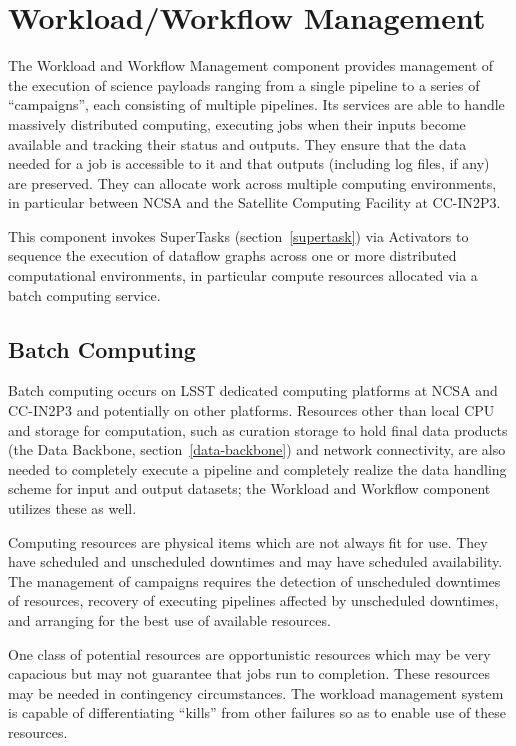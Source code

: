 \documentclass[DM,lsstdraft,toc]{lsstdoc}
\begin{document}
\section{Workload/Workflow Management}\label{workload-workflow-management}

The Workload and Workflow Management component provides management of the
execution of science payloads ranging from a single pipeline to a series of
``campaigns'', each consisting of multiple pipelines. Its services are able to
handle massively distributed computing, executing jobs when their inputs become
available and tracking their status and outputs. They ensure that the data
needed for a job is accessible to it and that outputs (including log files, if
any) are preserved. They can allocate work across multiple computing
environments, in particular between NCSA and the Satellite Computing Facility
at CC-IN2P3.

This component invokes SuperTasks (section~\ref{supertask}) via Activators to
sequence the execution of dataflow graphs across one or more distributed
computational environments, in particular compute resources allocated via a
batch computing service.

\subsection{Batch Computing}\label{batch-computing}

Batch computing occurs on LSST dedicated computing platforms at NCSA and
CC-IN2P3 and potentially on other platforms. Resources other than local CPU and
storage for computation, such as curation storage to hold final data products
(the Data Backbone, section~\ref{data-backbone}) and network connectivity, are
also needed to completely execute a pipeline and completely realize the data
handling scheme for input and output datasets; the Workload and Workflow
component utilizes these as well.
 
Computing resources are physical items which are not always fit for use. They
have scheduled and unscheduled downtimes and may have scheduled availability.
The management of campaigns requires the detection of unscheduled downtimes of
resources, recovery of executing pipelines affected by unscheduled downtimes,
and arranging for the best use of available resources. 
 
One class of potential resources are opportunistic resources which may be very
capacious but may not guarantee that jobs run to completion. These resources
may be needed in contingency circumstances. The workload management system is
capable of differentiating ``kills'' from other failures so as to enable use of
these resources. 
\end{document}
